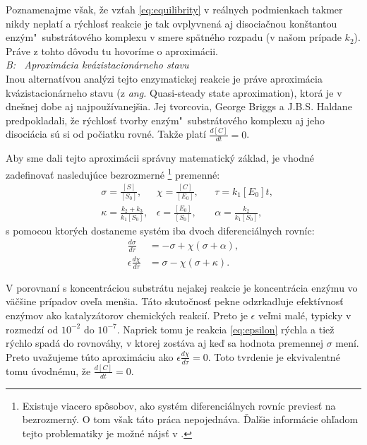 \documentclass[11pt,final,oneside]{fithesis}
\begin{document}
Poznamenajme v\v sak, \v ze vz\v tah \ref{eq:equilibrity} v re\'alnych podmienkach takmer nikdy neplat\'i a r\'ychlos\v t reakcie je tak ovplyvnen\'a
aj disocia\v cnou kon\v stantou enz\'ym"~substr\'atov\'eho komplexu v smere sp\"atn\'eho rozpadu (v na\v som pr\'ipade $k_2$). Pr\'ave z tohto d\^ ovodu tu
hovor\'ime o aproxim\'acii. \cite{Keener:1998:MP:Enzymes}
\\

\noindent
\textit{B: \ Aproxim\'acia kv\'azistacion\'arneho stavu}
\\

Inou alternat\'ivou anal\'yzi tejto enzymatickej reakcie je pr\'ave aproxim\'acia kv\'azistacion\'arneho stavu 
(z \textit{ang.} Quasi-steady state aproximation), ktor\'a je v dne\v snej dobe aj
najpou\v z\'ivanej\v sia. Jej tvorcovia, George Briggs a J.B.S. Haldane predpokladali, \v ze r\'ychlos\v t tvorby en\-z\'ym"~substr\'atov\'eho komplexu 
aj jeho disoci\'acia s\'u si od po\v ciatku rovn\'e. Tak\v ze plat\'i $\frac{d[C]}{dt} = 0$.

Aby sme dali tejto aproxim\'acii spr\'avny matematick\'y z\'aklad, je vhodn\'e zadefinova\v t nasleduj\'uce bezrozmern\'e
\footnote{Existuje viacero sp\^ osobov, ako syst\'em diferenci\'alnych rovn\'ic previes\v t na bezrozmern\'y. O tom v\v sak t\'ato pr\'aca nepojedn\'ava. 
\v Dal\v sie inform\'acie oh\v ladom tejto problematiky je mo\v zn\'e n\'ajs\v t v \cite{Keener:1998:MP:MathBackground}.}
premenn\'e:
\begin{align}
&\sigma = \frac{[S]}{[S_0]}, &\chi = \frac{[C]}{[E_0]},& &\tau = k_1[E_0]t,\nonumber \\
&\kappa = \frac{k_2 + k_3}{k_1[S_0]}, &\epsilon = \frac{[E_0]}{[S_0]},& &\alpha = \frac{k_2}{k_1[S_0]},
\end{align}
s pomocou ktor\'ych dostaneme syst\'em iba dvoch diferenci\'alnych rovn\'ic:
\begin{align}
\frac{d\sigma}{d\tau} &= -\sigma + \chi(\sigma + \alpha),\\
\label{eq:epsilon}
\epsilon\frac{d\chi}{d\tau} &= \sigma - \chi(\sigma + \kappa).
\end{align}

V porovnan\'i s koncentr\'aciou substr\'atu nejakej reakcie je koncentr\'acia enz\'ymu vo v\" a\v c\v sine pr\'ipadov ove\v la men\v sia. T\'ato 
skuto\v cnos\v t pekne odzrkadluje efekt\'ivnos\v t enz\'ymov ako katalyz\'atorov chemick\'ych reakci\'i. Preto je $\epsilon$ ve\v lmi mal\'e, typicky 
v rozmedz\'i od $10^{-2}$ do $10^{-7}$. Napriek tomu je reakcia \ref{eq:epsilon} r\'ychla a tie\v z r\'ychlo spad\'a do rovnov\'ahy, v ktorej zost\'ava
aj ke\v d sa hodnota premennej $\sigma$ men\'i. Preto uva\v zujeme t\'uto aproxim\'aciu ako $\epsilon\frac{d\chi}{d\tau} = 0$. Toto tvrdenie je ekvivalentn\'e
tomu \'uvodn\'emu, \v ze $\frac{d[C]}{dt} = 0$.
\end{document}

